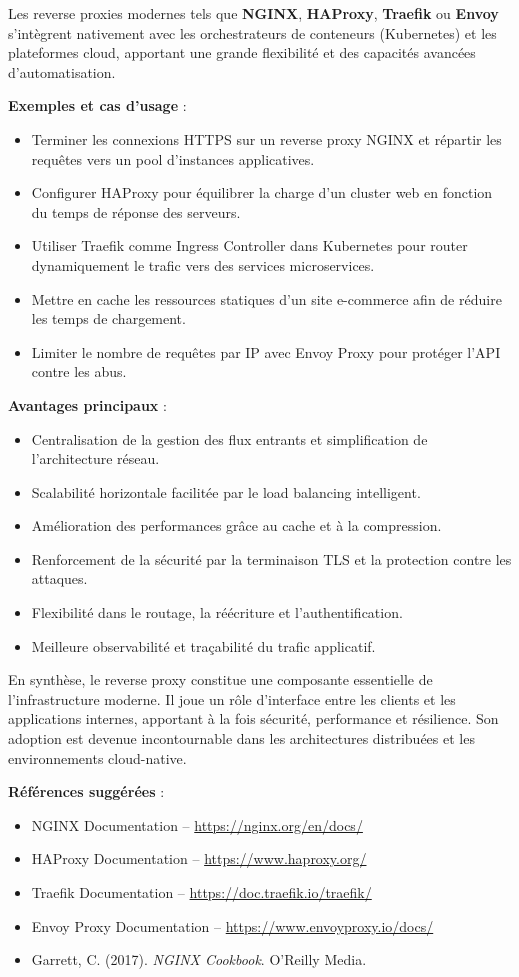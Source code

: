 Les reverse proxies modernes tels que \textbf{NGINX}, \textbf{HAProxy}, \textbf{Traefik} ou \textbf{Envoy} s’intègrent nativement avec les orchestrateurs de conteneurs (Kubernetes) et les plateformes cloud, apportant une grande flexibilité et des capacités avancées d’automatisation.

\textbf{Exemples et cas d’usage} :
\begin{itemize}
	\item Terminer les connexions HTTPS sur un reverse proxy NGINX et répartir les requêtes vers un pool d’instances applicatives.
	\item Configurer HAProxy pour équilibrer la charge d’un cluster web en fonction du temps de réponse des serveurs.
	\item Utiliser Traefik comme Ingress Controller dans Kubernetes pour router dynamiquement le trafic vers des services microservices.
	\item Mettre en cache les ressources statiques d’un site e-commerce afin de réduire les temps de chargement.
	\item Limiter le nombre de requêtes par IP avec Envoy Proxy pour protéger l’API contre les abus.
\end{itemize}

\textbf{Avantages principaux} :
\begin{itemize}
	\item Centralisation de la gestion des flux entrants et simplification de l’architecture réseau.
	\item Scalabilité horizontale facilitée par le load balancing intelligent.
	\item Amélioration des performances grâce au cache et à la compression.
	\item Renforcement de la sécurité par la terminaison TLS et la protection contre les attaques.
	\item Flexibilité dans le routage, la réécriture et l’authentification.
	\item Meilleure observabilité et traçabilité du trafic applicatif.
\end{itemize}

En synthèse, le reverse proxy constitue une composante essentielle de l’infrastructure moderne. Il joue un rôle d’interface entre les clients et les applications internes, apportant à la fois sécurité, performance et résilience. Son adoption est devenue incontournable dans les architectures distribuées et les environnements cloud-native.

\textbf{Références suggérées} :
\begin{itemize}
	\item NGINX Documentation – \url{https://nginx.org/en/docs/}
	\item HAProxy Documentation – \url{https://www.haproxy.org/}
	\item Traefik Documentation – \url{https://doc.traefik.io/traefik/}
	\item Envoy Proxy Documentation – \url{https://www.envoyproxy.io/docs/}
	\item Garrett, C. (2017). \textit{NGINX Cookbook}. O’Reilly Media.
\end{itemize}

